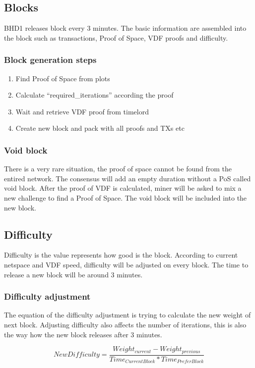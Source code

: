 \subsection{Blocks}
\begin{flushleft}
    BHD1 releases block every 3 minutes. The basic information are assembled into the block such as transactions, Proof of Space, VDF proofs and difficulty.
\end{flushleft}
\subsubsection{Block generation steps}
\begin{enumerate}
    \item Find Proof of Space from plots
    \item Calculate ``required\_iterations'' according the proof
    \item Wait and retrieve VDF proof from timelord
    \item Create new block and pack with all proofs and TXs etc
\end{enumerate}

\subsubsection{Void block}
\begin{flushleft}
    There is a very rare situation, the proof of space cannot be found from the entired network. The consensus will add an empty duration without a PoS called void block. After the proof of VDF is calculated, miner will be asked to mix a new challenge to find a Proof of Space. The void block will be included into the new block.
\end{flushleft}
\subsection{Difficulty}
\begin{flushleft}
    Difficulty is the value represents how good is the block. According to current netspace and VDF speed, difficulty will be adjusted on every block. The time to release a new block will be around 3 minutes.
\end{flushleft}
\subsubsection{Difficulty adjustment}
\begin{flushleft}
    The equation of the difficulty adjustment is trying to calculate the new weight of next block. Adjusting difficulty also affects the number of iterations, this is also the way how the new block releases after 3 minutes.
\end{flushleft}
\begin{equation}
    NewDifficulty = \frac{Weight_{current} - Weight_{previous}}{Time_{CurrentBlock} * Time_{PreferBlock}}
\end{equation}
